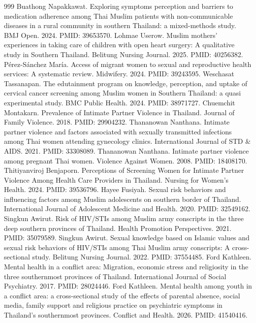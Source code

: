 \documentclass[11pt]{article}
\begin{document}
\begin{thebibliography}{999}
 Buathong Napakkawat. Exploring symptoms perception and barriers to medication adherence among Thai Muslim patients with non-communicable diseases in a rural community in southern Thailand: a mixed-methods study. BMJ Open. 2024. PMID: 39653570.
 Lohmae Userow. Muslim mothers' experiences in taking care of children with open heart surgery: A qualitative study in Southern Thailand. Belitung Nursing Journal. 2025. PMID: 40256382.
 Pérez-Sánchez María. Access of migrant women to sexual and reproductive health services: A systematic review. Midwifery. 2024. PMID: 39243595.
 Weschasat Tassanapan. The edutainment program on knowledge, perception, and uptake of cervical cancer screening among Muslim women in Southern Thailand: a quasi experimental study. BMC Public Health. 2024. PMID: 38971727.
 Chuemchit Montakarn. Prevalence of Intimate Partner Violence in Thailand. Journal of Family Violence. 2018. PMID: 29904232.
 Thananowan Nanthana. Intimate partner violence and factors associated with sexually transmitted infections among Thai women attending gynecology clinics. International Journal of STD \& AIDS. 2021. PMID: 33308089.
 Thananowan Nanthana. Intimate partner violence among pregnant Thai women. Violence Against Women. 2008. PMID: 18408170.
 Thitiyanviroj Benjaporn. Perceptions of Screening Women for Intimate Partner Violence Among Health Care Providers in Thailand. Nursing for Women's Health. 2024. PMID: 39536796.
 Hayee Fusiyah. Sexual risk behaviors and influencing factors among Muslim adolescents on southern border of Thailand. International Journal of Adolescent Medicine and Health. 2020. PMID: 32549162.
 Singkun Awirut. Risk of HIV/STIs among Muslim army conscripts in the three deep southern provinces of Thailand. Health Promotion Perspectives. 2021. PMID: 35079589.
 Singkun Awirut. Sexual knowledge based on Islamic values and sexual risk behaviors of HIV/STIs among Thai Muslim army conscripts: A cross-sectional study. Belitung Nursing Journal. 2022. PMID: 37554485.
 Ford Kathleen. Mental health in a conflict area: Migration, economic stress and religiosity in the three southernmost provinces of Thailand. International Journal of Social Psychiatry. 2017. PMID: 28024446.
 Ford Kathleen. Mental health among youth in a conflict area: a cross-sectional study of the effects of parental absence, social media, family support and religious practice on psychiatric symptoms in Thailand's southernmost provinces. Conflict and Health. 2026. PMID: 41540416.

\end{thebibliography}
\end{document}
